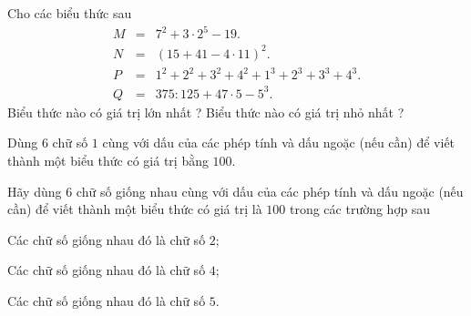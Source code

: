 \begin{vd}%
	Cho các biểu thức sau
	\[\begin{array}{ccl} 
	M&=&7^2+3\cdot 2^5-19.\\
	N&=&(15+41-4\cdot 11)^2.\\
	P&=&1^2+2^2+3^2+4^2+1^3+2^3+3^3+4^3.\\
	Q&=&375:125+47\cdot 5 -5^3.
	\end{array}
	\]
	Biểu thức nào có giá trị lớn nhất ? Biểu thức nào có giá trị nhỏ nhất ?
\end{vd}
\begin{vd}%
	Dùng $ 6 $ chữ số $ 1 $ cùng với dấu của các phép tính và dấu ngoặc (nếu cần) để viết thành một biểu thức có giá trị bằng $ 100 $.
\end{vd}
\begin{vd}%
	Hãy dùng $ 6 $ chữ số giống nhau cùng với dấu của các phép tính và dấu ngoặc (nếu cần) để viết thành một biểu thức có giá trị là $ 100 $ trong các trường hợp sau
	\begin{listEX}
		\item Các chữ số giống nhau đó là chữ số $ 2 $;
		\item Các chữ số giống nhau đó là chữ số $ 4 $;
		\item Các chữ số giống nhau đó là chữ số $ 5 $.
	\end{listEX}
\end{vd}
